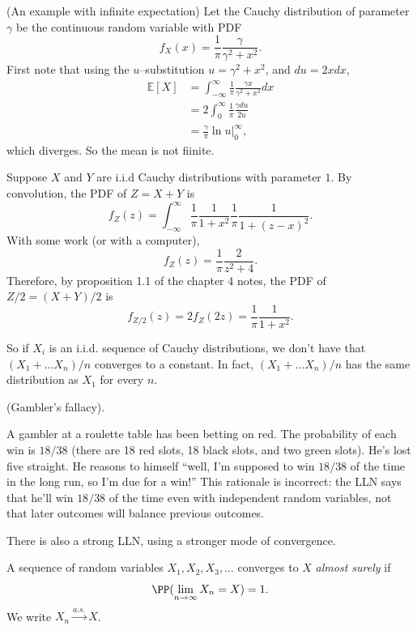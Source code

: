 \documentclass{ximera}
\begin{document}
\begin{example}
(An example with infinite expectation)
Let the Cauchy distribution of parameter $\gamma$ be the continuous random variable with PDF
$$
f_X(x) = \frac{1}{\pi } \frac{\gamma}{\gamma^2 + x^2}.
$$
First note that using the $u$--substitution $u=\gamma^2 + x^2$, and $du=2xdx$,
\begin{align*}
\mathbb{E}[X] &= \int_{-\infty}^{\infty} \frac{1}{\pi } \frac{\gamma x}{\gamma^2 + x^2} dx \\
&= 2 \int_0^{\infty} \frac{1}{\pi  } \frac{\gamma du}{2u}\\
&= \frac{\gamma}{\pi} \ln u \vert_{0}^{\infty}, 
\end{align*}
which diverges. So the mean is not fiinite.

Suppose $X$ and $Y$ are i.i.d Cauchy distributions with parameter $1$. By convolution, the PDF of $Z=X+Y$ is
$$
f_Z(z) = \int_{-\infty}^{\infty} \frac{1}{\pi} \frac{1}{1 + x^2} \frac{1}{\pi}  \frac{1}{1 + (z-x)^2} .
$$
With some work (or with a computer),
$$
f_Z(z) = \frac{1}{\pi} \frac{2}{z^2+4}.
$$
Therefore, by proposition 1.1 of the chapter 4 notes, the PDF of $Z/2 = (X+Y)/2$ is
$$
f_{Z/2}(z) = 2 f_Z(2z) = \frac{1}{\pi} \frac{1}{1+x^2}.
$$

So if $X_i$ is an i.i.d. sequence of Cauchy distributions, we don't have that $(X_1 + \ldots X_n)/n$ converges to a constant. In fact, $(X_1 + \ldots X_n)/n$ has the same distribution as $X_1$ for every $n$.
\end{example}

\begin{example}
(Gambler's fallacy).

A gambler at a roulette table has been betting on red. The probability of each win is $18/38$ (there are 18 red slots, 18 black slots, and two green slots). He's lost five straight. He reasons to himself ``well, I'm supposed to win $18/38$ of the time in the long run, so I'm due for a win!'' This rationale is incorrect: the LLN says that he'll win $18/38$ of the time even with independent random variables, not that later outcomes will balance previous outcomes. 
\end{example}

There is also a strong LLN, using a stronger mode of convergence. 
\begin{definition}
A sequence of random variables $X_1,X_2,X_3,\ldots$ converges to $X$ \textit{almost surely} if
$$
\PP( \lim_{n\rightarrow \infty} X_n = X)=1.
$$
We write $X_n \stackrel{a.s.}{\rightarrow} X$.
\end{definition}
\end{document}
